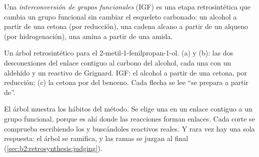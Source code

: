\begin{definition}\label{def:b2:retrosynthesis:fgi}
Una \emph{interconversión de grupos funcionales} (IGF) es una
etapa retrosintética que cambia un grupo funcional sin cambiar el esqueleto carbonado: un alcohol
a partir de una cetona (por reducción), una cadena alcano a partir de un alqueno (por hidrogenación), una amina a partir de una amida.
\end{definition}

\begin{omfigure}
\par\vspace{6pt}

{\small Un árbol retrosintético para el 2-metil-1-fenilpropan-1-ol. (a) y (b): las dos desconexiones del
enlace  contiguo al carbono del alcohol, cada una con un aldehído y un reactivo de Grignard. IGF: el alcohol
a partir de una cetona, por reducción; (c) la cetona por  del benceno. Cada flecha
se lee ``se prepara a partir de''.}
\end{omfigure}

El árbol muestra los hábitos del método. Se elige una  en un enlace contiguo a un grupo
funcional, porque es ahí donde las reacciones forman enlaces. Cada corte se comprueba escribiendo los  y
buscándoles reactivos reales. Y rara vez hay una sola respuesta: el árbol se ramifica, y las ramas se
juzgan al final (\cref{sec:b2:retrosynthesis:judging}).

